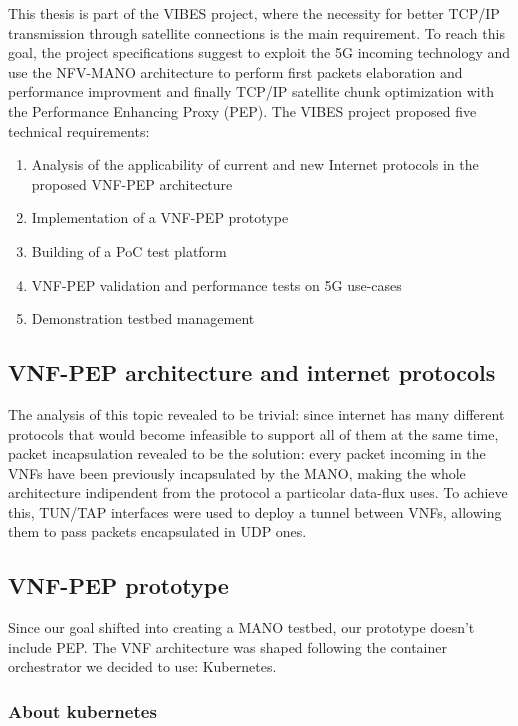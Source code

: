 \documentclass[10pt]{book}
\begin{document}
 This thesis is part of the VIBES project, where the necessity for better TCP/IP 
transmission through satellite connections is the main requirement. To 
reach this goal, the project specifications suggest to exploit the 5G incoming 
technology and use the NFV-MANO architecture to perform first packets 
elaboration and performance improvment and finally TCP/IP satellite chunk
optimization with the Performance Enhancing Proxy (PEP). The VIBES project 
proposed five technical requirements:
\begin{enumerate}
 \item Analysis of the applicability of current and new Internet protocols in
the proposed VNF-PEP architecture
 \item Implementation of a VNF-PEP prototype
 \item Building of a PoC test platform
 \item VNF-PEP validation and performance tests on 5G use-cases
 \item Demonstration testbed management
\end{enumerate}

\subsection{VNF-PEP architecture and internet protocols}

The analysis of this topic revealed to be trivial: since internet has many 
different protocols that would become infeasible to support all of them at the 
same time, packet incapsulation revealed to be the solution: every packet 
incoming in the VNFs have been previously incapsulated by the MANO, making the 
whole architecture indipendent from the protocol a particolar data-flux uses. 
To achieve this, TUN/TAP interfaces were used to deploy 
a tunnel between VNFs, allowing them to pass packets encapsulated in UDP ones.

\subsection{VNF-PEP prototype}

Since our goal shifted into creating a MANO testbed, our prototype doesn't 
include PEP. The VNF architecture was shaped following the container 
orchestrator we decided to use: Kubernetes.

\subsubsection{About kubernetes}
\end{document}
